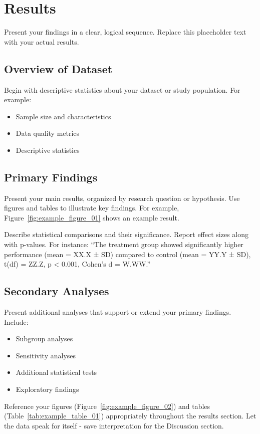 
\section{Results}

Present your findings in a clear, logical sequence. Replace this placeholder text with your actual results.

\subsection{Overview of Dataset}

Begin with descriptive statistics about your dataset or study population. For example:
\begin{itemize}
    \item Sample size and characteristics
    \item Data quality metrics
    \item Descriptive statistics
\end{itemize}

\subsection{Primary Findings}

Present your main results, organized by research question or hypothesis. Use figures and tables to illustrate key findings. For example, Figure~\ref{fig:example_figure_01} shows an example result.

Describe statistical comparisons and their significance. Report effect sizes along with p-values. For instance: ``The treatment group showed significantly higher performance (mean = XX.X ± SD) compared to control (mean = YY.Y ± SD), t(df) = ZZ.Z, p < 0.001, Cohen's d = W.WW.''

\subsection{Secondary Analyses}

Present additional analyses that support or extend your primary findings. Include:
\begin{itemize}
    \item Subgroup analyses
    \item Sensitivity analyses
    \item Additional statistical tests
    \item Exploratory findings
\end{itemize}

Reference your figures (Figure~\ref{fig:example_figure_02}) and tables (Table~\ref{tab:example_table_01}) appropriately throughout the results section. Let the data speak for itself - save interpretation for the Discussion section.

